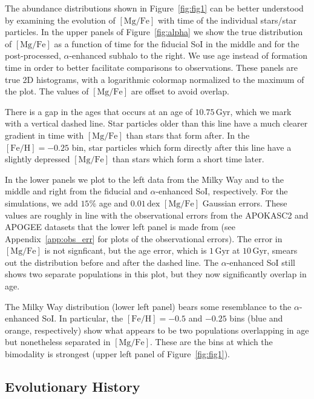 \documentclass[linenumbers, twocolumn]{aastex631}
\newcommand{\Gyr}{\ensuremath{\textrm{Gyr}}}
\newcommand{\FeH}{\ensuremath{[\textrm{Fe}/\textrm{H}]}}
\newcommand{\MgFe}{\ensuremath{[\textrm{Mg}/\textrm{Fe}]}}
\newcommand{\dex}{\ensuremath{\textrm{dex}}}
\begin{document}
The abundance distributions shown in Figure~\ref{fig:fig1} can be better understood by examining the evolution of \MgFe{} with time of the individual stars/star particles. In the upper panels of Figure~\ref{fig:alpha} we show the true distribution of \MgFe{} as a function of time for the fiducial SoI in the middle and for the post-processed, $\alpha$-enhanced subhalo to the right. We use age instead of formation time in order to better facilitate comparisons to observations. These panels are true 2D histograms, with a logarithmic colormap normalized to the maximum of the plot. The values of \MgFe{} are offset to avoid overlap.

There is a gap in the ages that occurs at an age of $10.75\,\Gyr$, which we mark with a vertical dashed line. Star particles older than this line have a much clearer gradient in time with \MgFe{} than stars that form after. In the $\FeH=-0.25$ bin, star particles which form directly after this line have a slightly depressed \MgFe{} than stars which form a short time later.

In the lower panels we plot to the left data from the Milky Way and to the middle and right from the fiducial and $\alpha$-enhanced SoI, respectively. For the simulations, we add $15\%$ age and $0.01\,\dex$ \MgFe{} Gaussian errors. These values are roughly in line with the observational errors from the APOKASC2 and APOGEE datasets that the lower left panel is made from (see Appendix~\ref{app:obs_err} for plots of the observational errors). The error in \MgFe{} is not signficant, but the age error, which is $1\,\Gyr$ at $10\,\Gyr$, smears out the distribution before and after the dashed line. The $\alpha$-enhanced SoI still shows two separate populations in this plot, but they now significantly overlap in age.

The Milky Way distribution (lower left panel) bears some resemblance to the $\alpha$-enhanced SoI. In particular, the $\FeH=-0.5$ and $-0.25$ bins (blue and orange, respectively) show what appears to be two populations overlapping in age but nonetheless separated in \MgFe{}. These are the bins at which the bimodality is strongest (upper left panel of Figure~\ref{fig:fig1}).

\subsection{Evolutionary History}\label{ssec:evol}
\end{document}
